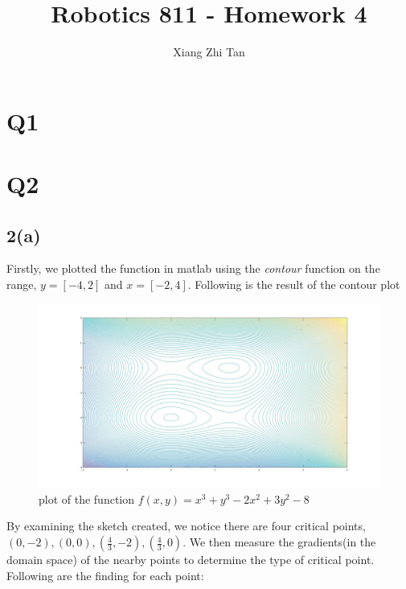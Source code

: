 \documentclass{article}
\begin{document}
\title{Robotics 811 - Homework 4}
\author{Xiang Zhi Tan}
\maketitle

\section{Q1}
\section{Q2}
\subsection*{2(a)}
Firstly, we plotted the function in matlab using the \textit{contour} function on the range, $y=[-4,2]$ and $x=[-2,4]$. Following is the result of the contour plot
\begin{figure}[H]
\centering
\includegraphics[width=6.5in]{figures/2a.jpg}
\caption{plot of the function $f(x,y) = x^3 + y^3 -2x^2 + 3y^2 - 8$}
\end{figure}
By examining the sketch created, we notice there are four critical points, $(0,-2),(0,0),(\frac{4}{3},-2),(\frac{4}{3},0)$.
We then measure the gradients(in the domain space) of the nearby points to determine the type of critical point. 
Following are the finding for each point:
\end{document}
